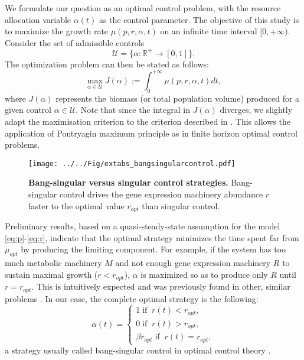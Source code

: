\documentclass[a4paper, 10pt, conference]{ieeeconf}      %
\begin{document}
We formulate our question as an optimal control problem, with the resource allocation variable $\alpha(t)$ as the control parameter.
The objective of this study is to maximize the growth rate $\mu(p,r, \alpha, t)$ on an infinite time interval $[0, +\infty)$.
Consider the set of admissible controls
\[
\mathcal{U}=\{\alpha:\mathbb{R}^+ \rightarrow [0,1] \}.
\]
The optimization problem can then be stated as follows:
\begin{equation}\label{Prob}
\max_{\alpha \in \mathcal{U}} J(\alpha):=\int_0^{+\infty} \mu(p, r, \alpha, t) dt,
\end{equation}
where $J(\alpha)$ represents the biomass (or total population volume) produced for a given control $\alpha\in \mathcal{U}$.
Note that since the integral in $J(\alpha)$ diverges, we slightly adapt the maximisation criterion to the criterion described in \cite{halkin_necessary_1974}. This allows the application of Pontryagin maximum principle as in finite horizon optimal control problems.

\begin{figure*}[htbp]
\centering
\texttt{[image: ../../Fig/extabs\_bangsingularcontrol.pdf]}
\caption{\textbf{Bang-singular versus singular control strategies.}
Bang-singular control drives the gene expression machinery abundance $r$ faster to the optimal value $r_{opt}$ than singular control.
}
\label{fig::simul}
\end{figure*}

\addtolength{\textheight}{-5.6cm}   %


Preliminary results, based on a quasi-steady-state assumption for the model \eqref{eq:p}-\eqref{eq:r}, indicate that the optimal strategy minimizes the time spent far from $\mu_{opt}$ by producing the limiting component.
For example, if the system has too much metabolic machinery $M$ and not enough gene expression machinery $R$ to sustain maximal growth ($r < r_{opt}$), $\alpha$ is maximized so as to produce only $R$ until $r = r_{opt}$.
This is intuitively expected and was previously found in other, similar problems \cite{pavlov_optimal_2013,berg_optimal_1998, berg_optimal_2002}. In our case, the complete optimal strategy is the following:
\begin{equation}
\alpha(t) = 
\begin{cases}
1 \; \text{if} \;\; r(t)<r_{opt},\\
0 \; \text{if} \;\; r(t)>r_{opt},\\
\beta r_{opt} \; \text{if} \;\; r(t)=r_{opt},
\end{cases}
\label{optstrat}
\end{equation}
a strategy usually called bang-singular control in optimal control theory \cite{bryson_applied_1975}. 
\end{document}
